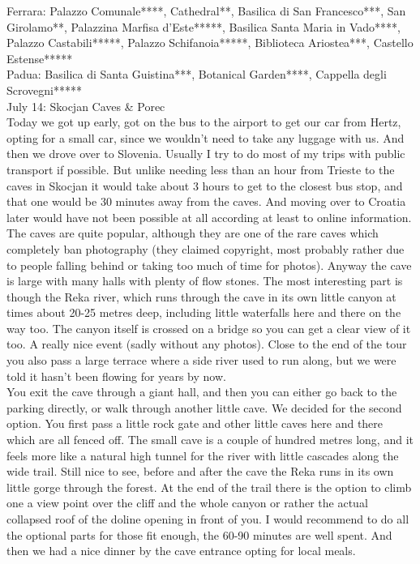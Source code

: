 Ferrara: Palazzo Comunale****, Cathedral**, Basilica di San Francesco***, San Girolamo**, Palazzina Marfisa d'Este*****, Basilica Santa Maria in Vado****, Palazzo Castabili*****, Palazzo Schifanoia*****, Biblioteca Ariostea***, Castello Estense*****\\
Padua: Basilica di Santa Guistina***, Botanical Garden****, Cappella degli Scrovegni*****\\

July 14: Skocjan Caves \& Porec\\
Today we got up early, got on the bus to the airport to get our car from Hertz, opting for a small car, since we wouldn't need to take any luggage with us. And then we drove over to Slovenia. Usually I try to do most of my trips with public transport if possible. But unlike needing less than an hour from Trieste to the caves in Skocjan it would take about 3 hours to get to the closest bus stop, and that one would be 30 minutes away from the caves. And moving over to Croatia later would have not been possible at all according at least to online information. The caves are quite popular, although they are one of the rare caves which completely ban photography (they claimed copyright, most probably rather due to people falling behind or taking too much of time for photos). Anyway the cave is large with many halls with plenty of flow stones. The most interesting part is though the Reka river, which runs through the cave in its own little canyon at times about 20-25 metres deep, including little waterfalls here and there on the way too. The canyon itself is crossed on a bridge so you can get a clear view of it too. A really nice event (sadly without any photos). Close to the end of the tour you also pass a large terrace where a side river used to run along, but we were told it hasn't been flowing for years by now.\\
You exit the cave through a giant hall, and then you can either go back to the parking directly, or walk through another little cave. We decided for the second option. You first pass a little rock gate and other little caves here and there which are all fenced off. The small cave is a couple of hundred metres long, and it feels more like a natural high tunnel for the river with little cascades along the wide trail. Still nice to see, before and after the cave the Reka runs in its own little gorge through the forest. At the end of the trail there is the option to climb one a view point over the cliff and the whole canyon or rather the actual collapsed roof of the doline opening in front of you. I would recommend to do all the optional parts for those fit enough, the 60-90 minutes are well spent. And then we had a nice dinner by the cave entrance opting for local meals.\\
